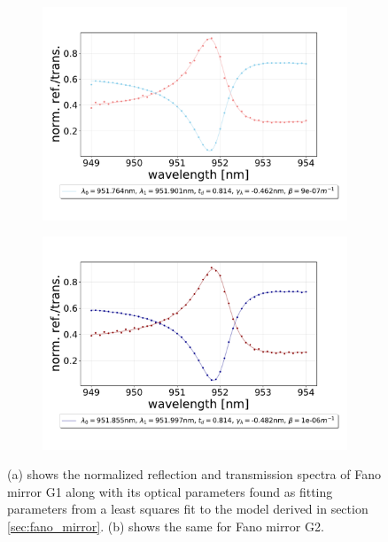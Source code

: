 \begin{figure}[h!]
    \centering
    \begin{subfigure}[b]{0.49\textwidth}
        \includegraphics[width=\textwidth]{figures/results/M3:M5/M5:G1_initial_spectrum.pdf}
        \caption{}
        \label{}
    \end{subfigure}
    \begin{subfigure}[b]{0.49\textwidth}
        \includegraphics[width=\textwidth]{figures/results/M3:M5/M3:G2_initial_spectrum.pdf}
        \caption{}
        \label{}
    \end{subfigure}
    \caption{(a) shows the normalized reflection and transmission spectra of Fano mirror G1 along with its optical parameters found as fitting parameters from a least squares fit to the model derived in section \ref{sec:fano_mirror}. (b) shows the same for Fano mirror G2.}
    \label{fig:individual_G1_and_G2_spectra}
\end{figure}

